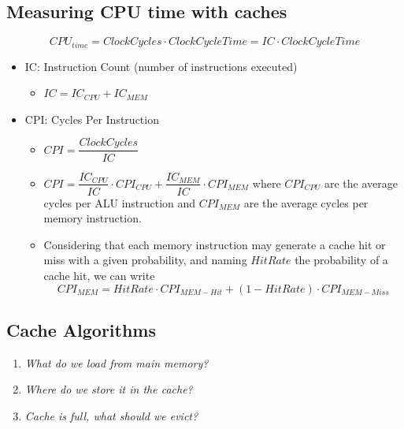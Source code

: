 \subsection{Measuring CPU time with caches}
\begin{equation}
   CPU_{time} = ClockCycles \cdot ClockCycleTime = IC \cdot ClockCycleTime
\end{equation}
\begin{itemize}
   \item IC: Instruction Count (number of instructions executed)
   \begin{itemize}
      \item $IC = IC_{CPU} + IC_{MEM}$
   \end{itemize}
   \item CPI: Cycles Per Instruction
   \begin{itemize}
      \item $CPI = \dfrac{ClockCycles}{IC}$
      \item $CPI = \dfrac{IC_{CPU}}{IC} \cdot CPI_{CPU} + \dfrac{IC_{MEM}}{IC} \cdot CPI_{MEM}$ where $CPI_{CPU}$ are the average cycles per ALU instruction and $CPI_{MEM}$ are the average cycles per memory instruction.
      \item Considering that each memory instruction may generate a cache hit or miss with a given probability, and naming $HitRate$ the probability of a cache hit, we can write 
      \begin{equation}
         CPI_{MEM} = HitRate \cdot CPI_{MEM - Hit} + (1-HitRate) \cdot CPI_{MEM - Miss}
      \end{equation}
   \end{itemize}
\end{itemize} 

\subsection{Cache Algorithms}
\begin{enumerate}
   \item \textit{What do we load from main memory?}
   \item \textit{Where do we store it in the cache?}
   \item \textit{Cache is full, what should we evict?}
\end{enumerate}


